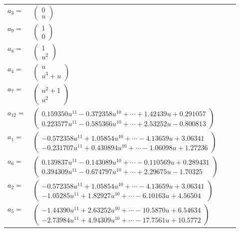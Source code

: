 \documentclass[1p]{elsarticle_modified}
\theoremstyle{definition}
\begin{document}
\begin{tabular}{m{7pt} m{180pt} m{7pt} m{180pt} }
\flushright $a_{3}=$&$\begin{pmatrix}0\\u\end{pmatrix}$ \\
\flushright $a_{9}=$&$\begin{pmatrix}1\\0\end{pmatrix}$ \\
\flushright $a_{8}=$&$\begin{pmatrix}1\\u^2\end{pmatrix}$ \\
\flushright $a_{4}=$&$\begin{pmatrix}u\\u^3+u\end{pmatrix}$ \\
\flushright $a_{7}=$&$\begin{pmatrix}u^2+1\\u^2\end{pmatrix}$ \\
\flushright $a_{12}=$&$\begin{pmatrix}0.159350 u^{11}-0.372358 u^{10}+\cdots+1.42439 u+0.291057\\0.223577 u^{11}-0.585366 u^{10}+\cdots+2.53252 u-0.800813\end{pmatrix}$ \\
\flushright $a_{1}=$&$\begin{pmatrix}-0.572358 u^{11}+1.05854 u^{10}+\cdots-4.13659 u+3.06341\\-0.231707 u^{11}+0.430894 u^{10}+\cdots-1.06098 u+1.27236\end{pmatrix}$ \\
\flushright $a_{6}=$&$\begin{pmatrix}0.139837 u^{11}-0.143089 u^{10}+\cdots-0.110569 u+0.289431\\0.394309 u^{11}-0.674797 u^{10}+\cdots+2.29675 u-1.70325\end{pmatrix}$ \\
\flushright $a_{2}=$&$\begin{pmatrix}-0.572358 u^{11}+1.05854 u^{10}+\cdots-4.13659 u+3.06341\\-1.05285 u^{11}+1.82927 u^{10}+\cdots-6.10163 u+4.56504\end{pmatrix}$ \\
\flushright $a_{5}=$&$\begin{pmatrix}-1.44390 u^{11}+2.63252 u^{10}+\cdots-10.5870 u+6.54634\\-2.73984 u^{11}+4.94309 u^{10}+\cdots-17.7561 u+10.5772\end{pmatrix}$ \\

\end{tabular}
\end{document}
